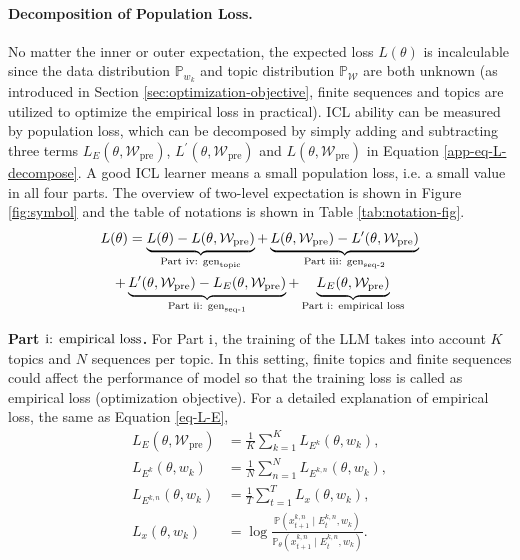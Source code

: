 \paragraph{Decomposition of Population Loss.} No matter the inner or outer expectation, the expected loss $L(\theta)$ is incalculable since the data distribution $\mathbb{P}_{w_k}$ and topic distribution $\mathbb{P}_{\mathcal{W}}$ are both unknown (as introduced in Section \ref{sec:optimization-objective}, finite sequences and topics are utilized to optimize the empirical loss in practical). ICL ability can be measured by population loss, which can be decomposed by simply adding and subtracting three terms $L_E(\theta,\mathcal{W}_{\text{pre}})$, $L^\prime(\theta,\mathcal{W}_{\text{pre}})$ and $L(\theta,\mathcal{W}_{\text{pre}})$ in Equation \ref{app-eq-L-decompose}. A good ICL learner means a small population loss, i.e. a small value in all four parts. The overview of two-level expectation is shown in Figure \ref{fig:symbol} and the table of notations is shown in Table \ref{tab:notation-fig}.
\begin{multline}\label{app-eq-L-decompose}
	L(\theta)=\underbrace{L(\theta) - L(\theta,\mathcal{W}_{\text{pre}})}_{\text{Part \uppercase\expandafter{\romannumeral4}: }\text{gen}_{\text{topic}}}+\underbrace{L(\theta,\mathcal{W}_{\text{pre}})-L^\prime(\theta,\mathcal{W}_{\text{pre}})}_{\text{Part \uppercase\expandafter{\romannumeral3}: }\text{gen}_{\text{seq-2}}}\\
    +\underbrace{L^\prime(\theta,\mathcal{W}_{\text{pre}})-L_E(\theta,\mathcal{W}_{\text{pre}})}_{\text{Part \uppercase\expandafter{\romannumeral2}: }\text{gen}_{\text{seq-1}}}+\underbrace{L_E(\theta,\mathcal{W}_{\text{pre}})}_{\text{Part \uppercase\expandafter{\romannumeral1}: empirical loss}}
\end{multline}

\textbf{Part $\text{\uppercase\expandafter{\romannumeral1}: empirical loss}$.} For Part $\text{\uppercase\expandafter{\romannumeral1}}$, the training of the LLM takes into account $K$ topics and $N$ sequences per topic. In this setting, finite topics and finite sequences could affect the performance of model so that the training loss is called as empirical loss (optimization objective). For a detailed explanation of empirical loss, the same as Equation \ref{eq-L-E},
\begin{align}
	L_E(\theta, \mathcal{W}_{\text{pre}})&=\frac{1}{K}\sum_{k=1}^K L_{E^k}(\theta,w_k), \nonumber \\
	L_{E^k}(\theta, w_k)&=\frac{1}{N}\sum_{n=1}^N L_{E^{k,n}}(\theta,w_k), \label{eq-L-E-complete}\\
	L_{E^{k,n}}(\theta,w_k)&=\frac{1}{T}\sum_{t=1}^T L_x(\theta, w_k), \nonumber\\ 
    L_x(\theta, w_k) &= \log \frac{\mathbb{P}(x^{k,n}_{t+1}\mid E^{k,n}_t, w_k)}{\mathbb{P}_\theta(x^{k,n}_{t+1}\mid E^{k,n}_t, w_k)}.\nonumber
\end{align}

